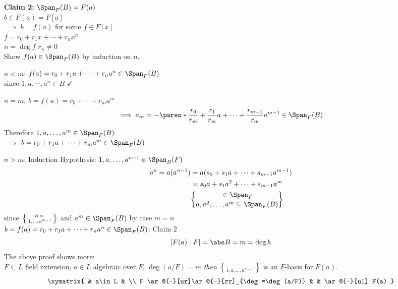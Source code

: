 \textbf{Claim 2:} $\Span_F(B)=F(a)$ \\
\pf $b\in F(a)=F[a]$ \\
$\implies$ $b=f(a)$ for some $f\in F[x]$ \\
$f=r_0+r_1x+\dotsb+r_nx^n$ \\
$n=\deg f$ \qquad $r_n\neq0$ \\
Show $f(a)\in\Span_F(B)$ by induction on $n$.

$n<m$: $f(a)=r_0+r_1a+\dotsb+r_na^n\in\Span_F(B)$ \\
since $1,a,\dotsb,a^n\in B$ $\checkmark$

$n=m$: $b=f(a)=r_0+\dotsb+r_ma^m$
\[ \implies a_m = - \paren*{\frac{r_0}{r_m}+\frac{r_1}{r_m}a+\dotsb+\frac{r_{m-1}}{r_m}a^{m-1}} \in \Span_F(B) \]
Therefore $1,a,\dotsc,a^m\in\Span_F(B)$ \\
$\implies$ $b=r_0+r_1a+\dotsb+r_ma^m\in\Span_F(B)$

$n>m$: Induction Hypothesis: $1,a,\dotsc,a^{n-1}\in\Span_B(F)$
\begin{align*}
a^n = a(a^{n-1}) &= a(s_0+s_1a+\dotsb+s_{m-1}a^{m-1}) \\
&= s_0a + s_1a^2 + \dotsb + s_{m-1}a^m \\
&\in\Span_F\brace{a,a^2,\dotsc,a^m}\subseteq\Span_F(B)
\end{align*}
since $B=\brace{1,\dotsc,a^{m-1}}$ and $a^m\in\Span_F(B)$ by case $m=n$ \\
$b=f(a)=r_0+r_1a+\dotsb+r_na^n\in\Span_F(B)$: Claim 2
\[ [F(a):F] = \abs B = m = \deg h \]
\cor The above proof shows more: \\
$F\subseteq L$ field extension, $a\in L$ algebraic over $F$, $\deg(a/F)=m$ \emph{then} $\brace{1,a,\dotsc,a^{m-1}}$ is an $F$-basis for $F(a)$.
\[ \xymatrix{
 & a\in L & \\
F \ar@{-}[ur]\ar@{-}[rr]_{\deg=\deg(a/F)} & & \ar@{-}[ul] F(a)
} \]
